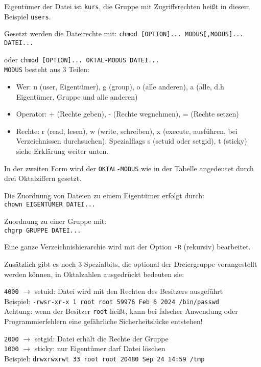 \documentclass[11pt]{article}
\begin{document}
Eigentümer der Datei ist \texttt{kurs}, die Gruppe mit Zugriffsrechten
heißt in diesem Beispiel \texttt{users}.

Gesetzt werden die Dateirechte mit:
\texttt{chmod [OPTION]... MODUS[,MODUS]... DATEI...}

oder \texttt{chmod [OPTION]... OKTAL-MODUS DATEI...}\\

\texttt{MODUS} besteht aus 3 Teilen:
\begin{itemize}
\item Wer: u (user, Eigentümer), g (group), o (alle anderen), a (alle,
  d.h Eigentümer, Gruppe und alle anderen)
\item Operator: + (Rechte geben), - (Rechte wegnehmen), = (Rechte
  setzen)
\item Rechte: r (read, lesen), w (write, schreiben), x (execute,
  ausführen, bei Verzeichnissen durchsuchen). Spezialflags s (setuid oder setgid), t (sticky) siehe Erklärung weiter unten.
\end{itemize}

In der zweiten Form wird der \texttt{OKTAL-MODUS} wie in der Tabelle
angedeutet durch drei Oktalziffern gesetzt. 

Die Zuordnung von Dateien zu einem Eigentümer erfolgt durch: \\
\texttt{chown EIGENTÜMER DATEI...}

Zuordnung zu einer Gruppe mit:\\
\texttt{chgrp GRUPPE DATEI...}

Eine ganze Verzeichnishierarchie wird mit der Option \texttt{-R} (rekursiv)
bearbeitet.

Zusätzlich gibt es noch 3 Spezialbits, die optional der Dreiergruppe vorangestellt werden können, in Oktalzahlen ausgedrückt bedeuten sie:

\texttt{4000} $ \rightarrow $ setuid: Datei wird mit den Rechten des Besitzers ausgeführt \\
Beispiel: \texttt{-rwsr-xr-x 1 root root 59976 Feb  6  2024 /bin/passwd} \\
Achtung: wenn der Besitzer \texttt{root} heißt, kann bei falscher Anwendung oder Programmierfehlern eine gefährliche Sicherheitslücke entstehen!

\texttt{2000} $ \rightarrow $ setgid: Datei erhält die Rechte der Gruppe \\

\texttt{1000} $ \rightarrow $ sticky: nur Eigentümer darf Datei löschen \\
Beispiel: \texttt{drwxrwxrwt 33 root root 20480 Sep 24 14:59 /tmp} \\
\end{document}
